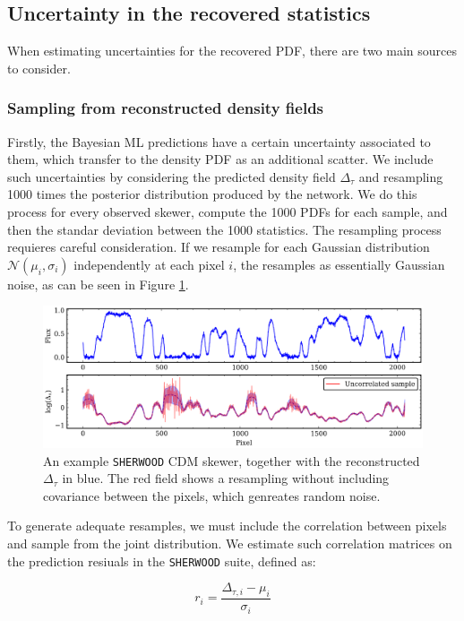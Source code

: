 \subsection{Uncertainty in the recovered statistics}
When estimating uncertainties for the recovered PDF, there are two main sources to consider.

\subsubsection{Sampling from reconstructed density fields}
Firstly, the Bayesian ML predictions have a certain uncertainty associated to them, which transfer to the density PDF as an additional scatter. We include such uncertainties by considering the predicted density field $\Delta_\tau$ and resampling 1000 times the posterior distribution produced by the network. We do this process for every observed skewer, compute the 1000 PDFs for each sample, and then the standar deviation between the 1000 statistics. The resampling process requieres careful consideration. If we resample for each Gaussian distribution $\mathcal{N}(\mu_i,\sigma_i)$ independently at each pixel $i$, the resamples as essentially Gaussian noise, as can be seen in Figure \ref{fig: resampling indep}.



\begin{figure}
    \centering
    \includegraphics[width=0.85\linewidth]{img/ML/ml_resample_no_covariance.png}
    \caption{An example \texttt{SHERWOOD} CDM skewer, together with the reconstructed $\Delta_\tau$ in blue. The red field shows a resampling without including covariance between the pixels, which genreates random noise.}
    \label{fig: resampling indep}
\end{figure}

To generate adequate resamples, we must include the correlation between pixels and sample from the joint distribution. We estimate such correlation matrices on the prediction resiuals in the \texttt{SHERWOOD} suite, defined as:

\begin{equation}\label{eq: residuals}
    r_i=\frac{\Delta_{\tau,i}-\mu_i}{\sigma_i}
\end{equation}

